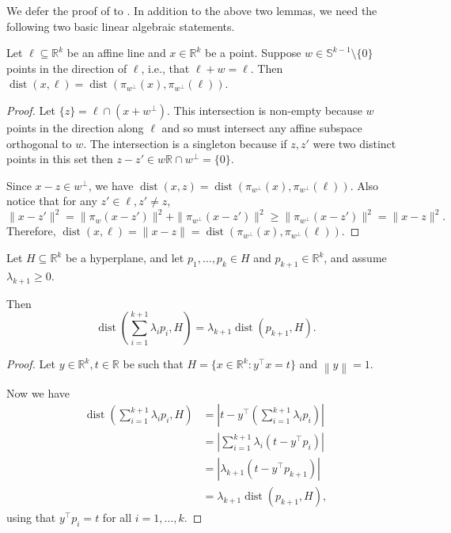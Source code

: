 \documentclass{article}\usepackage[a4paper,margin=20mm]{geometry}
\newcommand{\R}{\mathbb R}
\newcommand{\T}{\top}
\newcommand{\norm}[1]{\left\|#1 \right\|}
\newcommand{\dist}{\operatorname{dist}}
\renewcommand{\subset}{\subseteq}
\begin{document}
We defer the proof of  to .
In addition to the above two lemmas, we need the following two basic linear algebraic statements.

\begin{fact}\label{lem:proj-dist}
    Let $\ell \subset \R^k$ be an affine line
    and $x \in \R^k$ be a point.
    Suppose $w \in \mathbb{S}^{k-1} \setminus \{0\}$
    points in the direction of $\ell$, i.e.,
    that $\ell + w = \ell$.
    Then $\dist(x, \ell) = \dist(\pi_{w^\perp}(x), \pi_{w^\perp}(\ell))$.
\end{fact}
\begin{proof}
    Let $\{z\} = \ell \cap (x + w^{\perp})$. This intersection is non-empty because
    $w$ points in the direction along $\ell$ and so must intersect any affine subspace orthogonal to $w$.
    The intersection is a singleton because
    if $z, z'$ were two distinct points in this set
    then $z-z' \in w\R \cap w^\perp = \{0\}$.

    Since $x-z \in w^\perp$, we have $\dist(x, z) = \dist(\pi_{w^\perp}(x), \pi_{w^\perp}(\ell))$. Also notice that for any $z' \in \ell, z' \neq z$,
    $$\|x - z'\|^2 = \|\pi_{w}(x - z')\|^2 + \|\pi_{w^\perp}(x - z')\|^2 \geq \|\pi_{w^\perp}(x - z')\|^2 = \|x - z\|^2.$$
    Therefore, $\dist(x, \ell) = \|x - z\| = \dist(\pi_{w^\perp}(x), \pi_{w^\perp}(\ell))$.
%
\end{proof}

\begin{fact}\label{lem:conv-comb-dist}
    Let $H \subset \R^k$ be a hyperplane, and let $p_1,\dots,p_k \in H$
    and $p_{k+1} \in \R^k$,
    and assume $\lambda_{k+1} \geq 0$.

    Then
    \[
    \dist(\sum_{i=1}^{k+1} \lambda_i p_i, H)
    =
    \lambda_{k+1} \dist(p_{k+1}, H).
    \]
\end{fact}
\begin{proof}
    Let $y \in \R^k, t \in \R$ be such that
    $H = \{x \in \R^k : y^\T x = t\}$
    and $\norm{y} = 1$.

    Now we have
    \begin{align*}
        \dist(\sum_{i=1}^{k+1} \lambda_i p_i, H)
        &= |t - y^\T (\sum_{i=1}^{k+1} \lambda_i p_i)| \\
        &= |\sum_{i=1}^{k+1} \lambda_i ( t -  y^\T p_i)| \\
        &= |\lambda_{k+1} ( t -  y^\T p_{k+1})| \\
        &= \lambda_{k+1} \dist( p_{k+1}, H),
    \end{align*}
    using that $y^\T p_i = t$ for all $i = 1,\dots,k$.
\end{proof}
\end{document}
